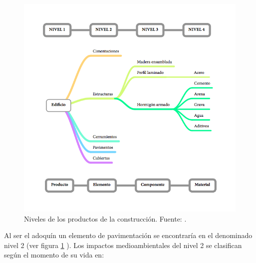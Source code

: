 \begin{figure}[!htb]
\centering
\includegraphics[width=15cm]{img/niveles_productos_construccion.png}
\caption[Niveles de los productos de la construcción.]{Niveles de los productos de la construcción. Fuente: \protect\cite{carvalho}.}
\label{fig:niveles_productos_construccion}
\end{figure}

Al ser el adoquín un elemento de pavimentación se encontraría en el denominado nivel 2 (ver figura \ref{fig:niveles_productos_construccion} ). Los impactos medioambientales del nivel 2 se clasifican según el momento de su vida en:

